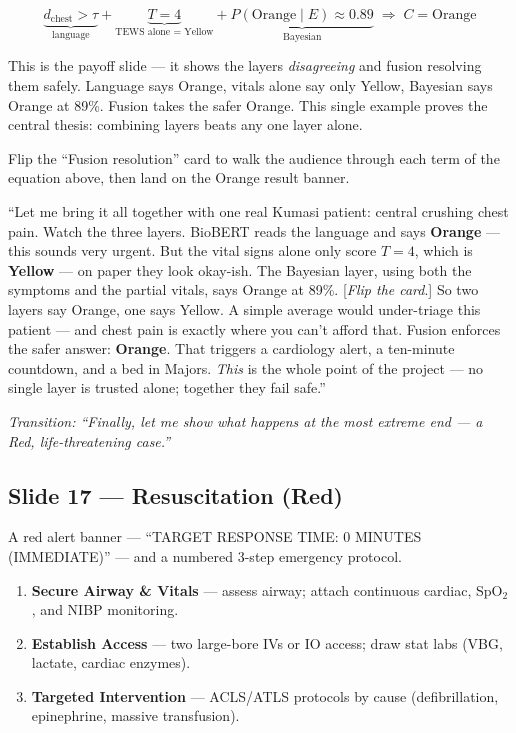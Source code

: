 \documentclass[11pt]{article}
\newcommand{\chip}[2]{\textcolor{#1}{\textbf{#2}}}
\newcommand{\transition}[1]{\medskip\noindent\textit{\textcolor{mutel}{Transition: #1}}\medskip}
\newcommand{\route}[1]{{\small\texttt{\textcolor{mutel}{#1}}}}
\newcommand{\slide}[3]{%
  \subsection{Slide #1 --- #2}%
  \noindent\route{Route: #3}\par\smallskip}
\begin{document}
\[
\underbrace{d_{\text{chest}}>\tau}_{\text{language}} + \underbrace{T=4}_{\text{TEWS alone = Yellow}} + \underbrace{P(\text{Orange}\mid E)\approx0.89}_{\text{Bayesian}} \;\Rightarrow\; C=\text{Orange}
\]

\begin{idea}
This is the payoff slide --- it shows the layers \emph{disagreeing} and fusion resolving them safely.
Language says Orange, vitals alone say only Yellow, Bayesian says Orange at 89\%. Fusion takes the safer
Orange. This single example proves the central thesis: combining layers beats any one layer alone.
\end{idea}

\begin{demo}
Flip the ``Fusion resolution'' card to walk the audience through each term of the equation above, then
land on the Orange result banner.
\end{demo}

\begin{saybox}
``Let me bring it all together with one real Kumasi patient: central crushing chest pain. Watch the three
layers. BioBERT reads the language and says \chip{satOrange}{Orange} --- this sounds very urgent. But the
vital signs alone only score $T=4$, which is \chip{satYellow}{Yellow} --- on paper they look okay-ish. The
Bayesian layer, using both the symptoms and the partial vitals, says Orange at 89\%. [\emph{Flip the
card}.] So two layers say Orange, one says Yellow. A simple average would under-triage this patient ---
and chest pain is exactly where you can't afford that. Fusion enforces the safer answer:
\chip{satOrange}{Orange}. That triggers a cardiology alert, a ten-minute countdown, and a bed in Majors.
\emph{This} is the whole point of the project --- no single layer is trusted alone; together they fail
safe.''
\end{saybox}

\transition{``Finally, let me show what happens at the most extreme end --- a Red, life-threatening case.''}

\slide{17}{Resuscitation (Red)}{/dashboard/pathways/resus}

\begin{onscreen}
A red alert banner --- ``TARGET RESPONSE TIME: 0 MINUTES (IMMEDIATE)'' --- and a numbered 3-step
emergency protocol.
\end{onscreen}

\begin{enumerate}
  \item \textbf{Secure Airway \& Vitals} --- assess airway; attach continuous cardiac, SpO$_2$, and NIBP monitoring.
  \item \textbf{Establish Access} --- two large-bore IVs or IO access; draw stat labs (VBG, lactate, cardiac enzymes).
  \item \textbf{Targeted Intervention} --- ACLS/ATLS protocols by cause (defibrillation, epinephrine, massive transfusion).
\end{enumerate}
\end{document}
